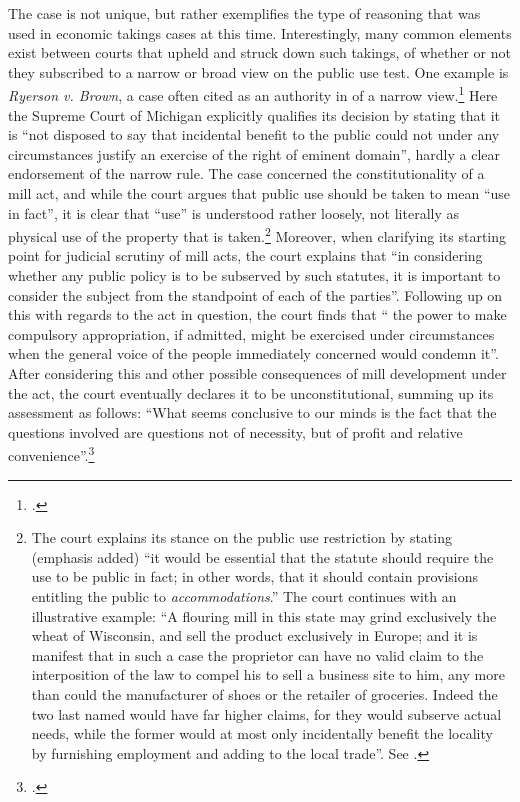 The case is not unique, but rather exemplifies the type of reasoning that was used in economic takings cases at this time. Interestingly, many common elements exist between courts that upheld and struck down such takings,  of whether or not they subscribed to a narrow or broad view on the public use test. One example is {\it Ryerson v. Brown}, a case often cited as an authority in  of a narrow view.\footcite{ryerson77} Here the Supreme Court of Michigan explicitly qualifies its decision by stating that it is ``not disposed to say that incidental benefit to the public could not under any circumstances justify an exercise of the right of eminent domain'', hardly a clear endorsement of the narrow rule. The case concerned the constitutionality of a mill act, and while the court argues that public use should be taken to mean ``use in fact'', it is clear that ``use'' is understood rather loosely, not literally as physical use of the property that is taken.\footnote{The court explains its stance on the public use restriction by stating (emphasis added) ``it would be essential that the statute should require the use to be public in fact; in other words, that it should contain provisions entitling the public to {\it accommodations}.'' The court continues with an illustrative example: ``A flouring mill in this state may grind exclusively the wheat of Wisconsin, and sell the product exclusively in Europe; and it is manifest that in such a case the proprietor can have no valid claim to the interposition of the law to compel his  to sell a business site to him, any more than could the manufacturer of shoes or the retailer of groceries. Indeed the two last named would have far higher claims, for they would subserve actual needs, while the former would at most only incidentally benefit the locality by furnishing employment and adding to the local trade''. See \cite[336]{ryerson77}.} Moreover, when clarifying its starting point for judicial scrutiny of mill acts, the court explains that ``in considering whether any public policy is to be subserved by such statutes, it is important to consider the subject from the standpoint of each of the parties''. Following up on this with regards to the act in question, the court finds that `` the power to make compulsory appropriation, if admitted, might be exercised under circumstances when the general voice of the people immediately concerned would condemn it''. After considering this and other possible consequences of mill development under the act, the court eventually declares it to be unconstitutional, summing up its assessment as follows: ``What seems conclusive to our minds is the fact that the questions involved are questions not of necessity, but of profit and relative convenience''.\footcite[336]{ryerson77}

